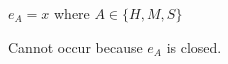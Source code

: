 \begin{case}

$e_{A}=x$ where $A\in\lbrace H,M,S\rbrace$

Cannot occur because $e_{A}$ is closed.

\end{case}
